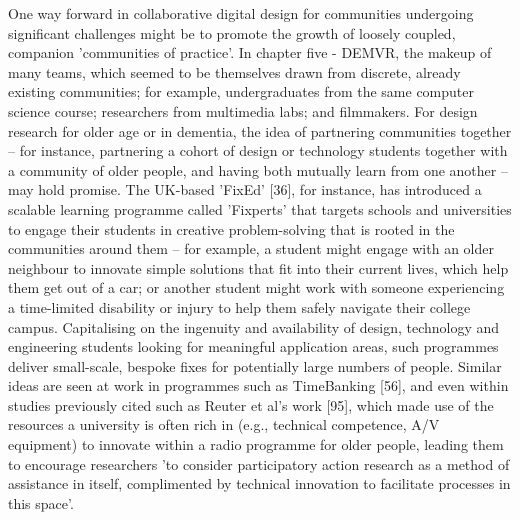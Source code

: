 One way forward in collaborative digital design for communities undergoing significant challenges might be to promote the growth of loosely coupled, companion 'communities of practice'. In chapter five - DEMVR, the makeup of many teams, which seemed to be themselves drawn from discrete, already existing communities; for example, undergraduates from the same computer science course; researchers from multimedia labs; and filmmakers. For design research for older age or in dementia, the idea of partnering communities together – for instance, partnering a cohort of design or technology students together with a community of older people, and having both mutually learn from one another – may hold promise. The UK-based 'FixEd' [36], for instance, has introduced a scalable learning programme called 'Fixperts' that targets schools and universities to engage their students in creative problem-solving that is rooted in the communities around them – for example, a student might engage with an older neighbour to innovate simple solutions that fit into their current lives, which help them get out of a car; or another student might work with someone experiencing a time-limited disability or injury to help them safely navigate their college campus. Capitalising on the ingenuity and availability of design, technology and engineering students looking for meaningful application areas, such programmes deliver small-scale, bespoke fixes for potentially large numbers of people. Similar ideas are seen at work in programmes such as TimeBanking [56], and even within studies previously cited such as Reuter et al's work [95], which made use of the resources a university is often rich in (e.g., technical competence, A/V equipment) to innovate within a radio programme for older people, leading them to encourage researchers 'to consider participatory action research as a method of assistance in itself, complimented by technical innovation to facilitate processes in this space'.

